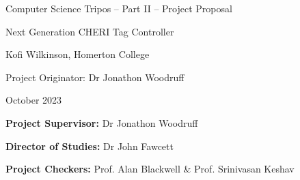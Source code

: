 \documentclass[10pt,a4paper]{article}
\begin{document}
{\centering \Large Computer Science Tripos -- Part II -- Project Proposal\par}
\vspace{1cm}
{\centering \Huge Next Generation CHERI Tag Controller\par}
\vspace{1.5cm}
{\centering \large Kofi Wilkinson, Homerton College\par}
{\centering \large Project Originator: Dr Jonathon Woodruff\par}
{\centering \large {} October 2023\par}
\vspace{1.5cm}


\textbf{Project Supervisor:} Dr Jonathon Woodruff\par
\textbf{Director of Studies:} Dr John Fawcett\par
\textbf{Project Checkers:} Prof. Alan Blackwell \& Prof. Srinivasan Keshav
\vspace{2cm}
\end{document}
